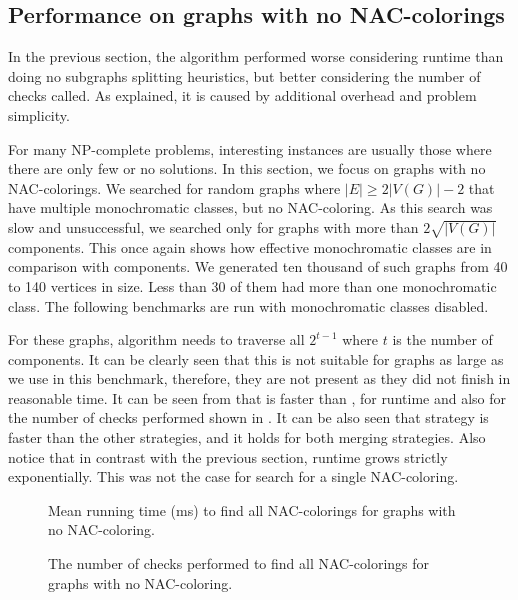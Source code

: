 \subsection{Performance on graphs with no NAC-colorings}

In the previous section, the \Subgraphs{} algorithm performed worse considering runtime
than doing no subgraphs splitting heuristics,
but better considering the number of checks called.
As explained, it is caused by additional overhead and problem simplicity.

For many NP-complete problems, interesting instances are usually
those where there are only few or no solutions.
In this section, we focus on graphs with no NAC-colorings.
We searched for random graphs where \( |E| \ge 2|V(G)| - 2 \) that have
multiple monochromatic classes, but no NAC-coloring.
As this search was slow and unsuccessful, we searched only for
graphs with more than \( 2\sqrt{|V(G)|} \) \trcon{} components.
This once again shows how effective monochromatic classes are
in comparison with \trcon{} components.
We generated ten thousand of such graphs from 40 to 140 vertices in size.
Less than 30 of them had more than one monochromatic class.
The following benchmarks are run with monochromatic classes disabled.

For these graphs, \NaiveCycles{} algorithm needs to traverse all \( 2^{t-1} \)
where \( t \) is the number of \trcon{} components. It can be clearly seen that
this is not suitable for graphs as large as we use in this benchmark,
therefore, they are not present as they did not finish in reasonable time.
It can be seen from 
that \SharedVertices{} is faster than \MergeLinear{},
for runtime and also for the number of checks performed
shown in .
It can be also seen that \NeighborsDegree{} strategy is
faster than the other strategies, and it holds for both merging strategies.
Also notice that in contrast with the previous section,
runtime grows strictly exponentially. This was not the case for search for a single NAC-coloring.

\begin{figure}[p]
	\centering
	\scalebox{0.5}{}
	\caption[Mean runtime for graphs with no NAC-coloring (some).]{
		Mean running time (ms) to find all NAC-colorings for graphs with no NAC-coloring.}%
	\label{fig:graph_no_nac_coloring_first_runtime}
\end{figure}
\begin{figure}[p]
	\centering
	\scalebox{0.5}{}
	\caption[Checks performed for graphs with no NAC-coloring (some).]{
		The number of checks performed to find all NAC-colorings for graphs with no NAC-coloring.}%
	\label{fig:graph_no_nac_coloring_first_checks}
\end{figure}

